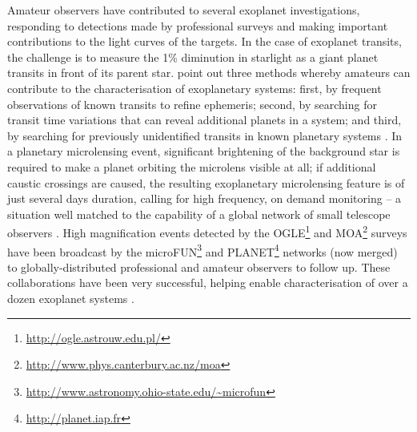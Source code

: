 \documentclass{ar2e}
\begin{document}
Amateur observers have contributed to several exoplanet investigations,
responding to detections made by professional surveys and making important
contributions to the light curves of the targets. In the case of exoplanet
transits, the challenge is to measure the 1\% diminution in starlight as a giant
planet transits in front of its parent star. \citet{13mousis} point out three
methods whereby amateurs can contribute to the characterisation of exoplanetary
systems: first, by frequent observations of known transits to refine ephemeris;
second, by searching for transit time variations that can reveal additional
planets in a system; and third, by searching for previously unidentified
transits in known planetary systems \citep[e.g., the discovery of the transit of
HD 80606b from a 30 cm telescope near London,][]{09fossey}. In a planetary
microlensing event, significant brightening of the background star is required
to make a planet orbiting the microlens visible at all; if additional caustic
crossings are caused, the resulting exoplanetary microlensing feature is of just
several days duration, calling for high frequency, on demand monitoring -- a
situation well matched to the capability of a global network of small telescope
observers \citep[see e.g.\ ][]{Christie++2006}. High magnification events
detected by the  OGLE\footnote{\url{http://ogle.astrouw.edu.pl/}} and
MOA\footnote{\url{http://www.phys.canterbury.ac.nz/moa}} surveys have been
broadcast by the
microFUN\footnote{\url{http://www.astronomy.ohio-state.edu/~microfun}} and
PLANET\footnote{\url{http://planet.iap.fr}} networks (now merged) to
globally-distributed professional and amateur observers to follow up. These
collaborations have been very successful, helping enable characterisation of
over a dozen exoplanet systems \citep[see e.g.\ ][and references
therein]{Udalski++2005,Gould++2014}.


% 
% 
\end{document}
